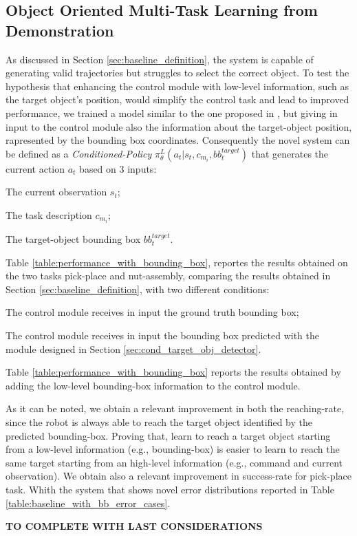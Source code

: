 \subsection{Object Oriented Multi-Task Learning from Demonstration}
\label{sec:obj_oriented_multi_task_lfd}
As discussed in Section \ref{sec:baseline_definition}, the system is capable of generating valid trajectories but struggles to select the correct object. To test the hypothesis that enhancing the control module with low-level information, such as the target object's position, would simplify the control task and lead to improved performance, we trained a model similar to the one proposed in \cite{mandi2022towards_more_generalizable_one_shot}, but giving in input to the control module also the information about the target-object position, rapresented by the bounding box coordinates.
Consequently the novel system can be defined as a \textit{Conditioned-Policy} $\pi^{L}_{\theta}(a_{t} | s_{t}, c_{m_{i}}, bb_{t}^{target})$ that generates the current action $a_{t}$ based on 3 inputs: \begin{enumerate*}[label=(\arabic*)]
    \item The current observation $s_{t}$;
    \item The task description $c_{m_{i}}$;
    \item The target-object bounding box $bb_{t}^{target}$.
\end{enumerate*}
\newline Table \ref{table:performance_with_bounding_box}, reportes the results obtained on the two tasks pick-place and nut-assembly, comparing the results obtained in Section \ref{sec:baseline_definition}, with two different conditions:
\begin{enumerate*}[label=(\arabic*)]
    \item The control module receives in input the ground truth bounding box;
    \item The control module receives in input the bounding box predicted with the module designed in Section \ref{sec:cond_target_obj_detector}.
\end{enumerate*}
\newline Table \ref{table:performance_with_bounding_box} reports the results obtained by adding the low-level bounding-box information to the control module.

As it can be noted, we obtain a relevant improvement in both the reaching-rate, since the robot is always able to reach the target object identified by the predicted bounding-box. Proving that, learn to reach a target object starting from a low-level information (e.g., bounding-box) is easier to learn to reach the same target starting from an high-level information (e.g., command and current observation). We obtain also a relevant improvement in success-rate for pick-place task. Whith the system that shows novel error distributions reported in Table \ref{table:baseline_with_bb_error_cases}.

\newline \textbf{TO COMPLETE WITH LAST CONSIDERATIONS}